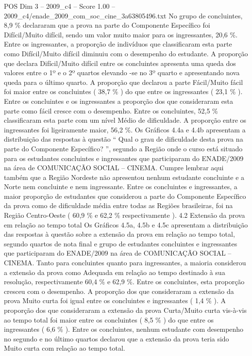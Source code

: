 \begin{textsample}{POS Dim 3 – 2009\_c4 – Score 1.00 – 2009\_c4/enade\_2009\_com\_soc\_cine\_3a63805496.txt}
No grupo de concluintes, 8,9 \% declararam que a prova na parte do Componente Específico foi Difícil/Muito difícil, sendo um valor muito maior para os ingressantes, 20,6 \%.
Entre os ingressantes, a proporção de indivíduos que classificaram esta parte como Difícil/Muito difícil diminuiu com o desempenho do estudante.
A proporção que declara Difícil/Muito difícil entre os concluintes apresenta uma queda dos valores entre o 1º e o 2º quartos elevando -se no 3º quarto e apresentando nova queda para o último quarto.
A proporção que declarou a parte Fácil/Muito fácil foi maior entre os concluintes ( 38,7 \% ) do que entre os ingressantes ( 23,1 \% ).
Entre os concluintes e os ingressantes a proporção dos que consideraram esta parte como fácil cresce com o desempenho.
Entre os concluintes, 52,5 \% classificaram esta parte com um nível Médio de dificuldade.
A proporção entre os ingressantes foi ligeiramente maior, 56,2 \%.
Os Gráficos 4.4a e 4.4b apresentam a distribuição das respostas à questão “ Qual o grau de dificuldade desta prova na parte do Componente Específico? ”, segundo a Região onde o curso está situado para os estudantes concluintes e ingressantes que participaram do ENADE/2009 na área de COMUNICAÇÃO SOCIAL – CINEMA.
Cumpre lembrar aqui também que a Região Nordeste não apresentou nenhum estudante concluinte e a Norte nem concluinte e nem ingressante.
Entre os concluintes e ingressantes, a maior proporção de estudantes que considerou a parte do Componente Específico da prova como de dificuldade média entre todas as Regiões brasileiras, foi na Região Centro-Oeste ( 60,9 \% e 62,2 \% respectivamente ). 4.2 Extensão da prova em relação ao tempo total Os Gráficos 4.5a, 4.5b e 4.5c apresentam a distribuição das respostas à questão sobre a extensão da prova em relação ao tempo total, segundo quartos de nota final e grupo de estudantes concluintes e ingressantes que participaram do ENADE/2009 na área de COMUNICAÇÃO SOCIAL – CINEMA.
Tanto para concluintes quanto para ingressantes, a maioria considerou a extensão da prova como Adequada em relação ao tempo destinado à sua resolução, respectivamente 60,4 \% e 62,9 \%.
Entre os concluintes, esta proporção cresceu com o desempenho.
A proporção dos que consideraram a extensão da prova Muito curta foi igual entre os concluintes e ingressantes ( 1,4 \% ).
A proporção dos que consideraram a extensão da prova Curta/Muito curta vis-à-vis ao tempo total foi maior entre os concluintes ( 8,5 \% ) do que entre os ingressantes ( 6,6 \% ).
Entre os concluintes, nenhum estudante com desempenho no segundo e no último quartos declarou que a extensão da prova teria sido Muito curta com relação ao tempo total.

\end{textsample}
